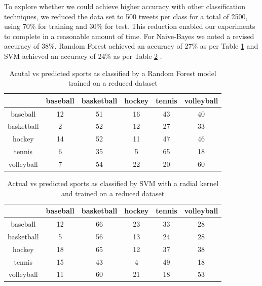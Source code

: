 \documentclass[journal, a4paper]{IEEEtran}
\begin{document}
To explore whether we could achieve higher accuracy with other classification techniques, we reduced the data set to 500 tweets per class for a total of 2500, using 70\% for training and 30\% for test. This reduction enabled our experiments to complete in a reasonable amount of time. For Naive-Bayes we noted a revised accuracy of 38\%. Random Forest achieved an accuracy of 27\% as per Table \ref{Tab:4} and SVM achieved an accuracy of 24\% as per Table \ref{Tab:5} .
\begin{table}[ht]
	\begin{center}
		\begin{tabular}{|c|c c c c c|}
			\hline
			\diagbox[width=8em]{actual}{predicted}& baseball & basketball & hockey & tennis& volleyball\\
			\hline
			baseball & 12&51&16&43&40\\
			basketball &2&52&12&27&33\\
			hockey & 14&52&11&47&46\\
			tennis &6&35&5&65&18\\
			volleyball& 7&54&22&20&60\\
			\hline
		\end{tabular}
	\end{center}
	\caption{Acutal vs predicted sports as classified by a Random Forest model trained on a reduced dataset}\label{Tab:4}
\end{table}
\begin{table}[ht]
	\begin{center}
		\begin{tabular}{|c|c c c c c|}
			\hline
			\diagbox[width=8em]{actual}{predicted}& baseball & basketball & hockey & tennis& volleyball\\
			\hline
			baseball &12&66&23&33&28\\
			basketball &5&56&13&24&28\\
			hockey &18&65 &12&37&38\\
			tennis &15&43&4&49&18\\
			volleyball&11&60&21&18&53\\
			\hline
		\end{tabular}
	\end{center}
	\caption{Actual vs predicted sports as classified by SVM with a radial kernel and trained on a reduced dataset}\label{Tab:5}
\end{table}
\end{document}
